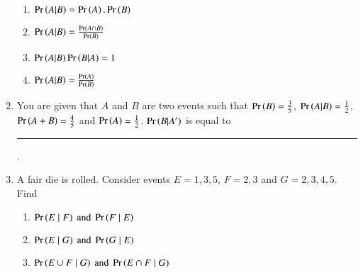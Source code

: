 \begin{enumerate}[label=\thesubsection.\arabic*,ref=\thesubsection.\theenumi,resume*]
\begin{multicols}{2}
\begin{enumerate}
	\item $\Pr\left(A|B\right) = \Pr\left(A\right).\Pr\left(B\right)$
	\item $\Pr\left(A|B\right) = \frac{\Pr\left(A\cap B\right)}{\Pr\left(B\right)}$
	\item $\Pr\left(A|B\right)\Pr\left(B|A\right) = 1$
	\item $\Pr\left(A|B\right) = \frac{\Pr\left(A\right)}{\Pr\left(B\right)}$
\end{enumerate}
\end{multicols}
\item You are given that $A$ and $B$ are two events such that $\Pr\left(B\right)=\frac{3}{5}$, $\Pr\left(A  |  B\right)=\frac{1}{2}$, $\Pr\left(A+B\right)=\frac{4}{5}$ and $\Pr\left(A\right)=\frac{1}{2}$.  $\Pr\left(B  |  A^\prime\right)$ is equal to \rule{1cm}{0.1pt}.
\item A fair die is rolled. Consider events $E=1,3,5,\, F=2,3$ and $G=2,3,4,5$. Find
\begin{enumerate}
\item $\Pr\left(E \mid F\right) \text{ and } \Pr\left(F \mid E\right)$
\item $\Pr\left(E \mid G\right) \text{ and } \Pr\left(G \mid E\right)$
\item $\Pr\left({E \cup F} \mid G\right) \text{ and } \Pr\left({E \cap F} \mid G\right)$
\end{enumerate}
%
\solution

\end{enumerate}
